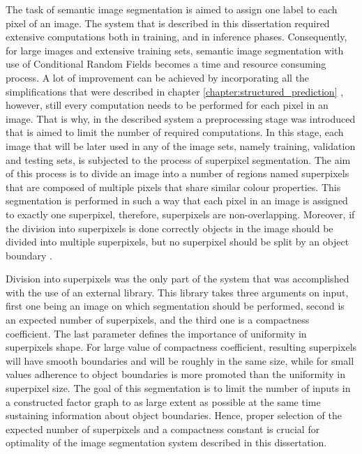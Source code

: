 The task of semantic image segmentation is aimed to assign one label to each pixel of an image. The system that is described in this dissertation required extensive computations both in training, and in inference phases. Consequently, for large images and extensive training sets, semantic image segmentation with use of Conditional Random Fields becomes a time and resource consuming process. A lot of improvement can be achieved by incorporating all the simplifications that were described in chapter \ref{chapter:structured_prediction} , however, still every computation needs to be performed for each pixel in an image. That is why, in the described system a preprocessing stage was introduced that is aimed to limit the number of required computations. In this stage, each image that will be later used in any of the image sets, namely training, validation and testing sets, is subjected to the process of superpixel segmentation. The aim of this process is to divide an image into a number of regions named superpixels that are composed of multiple pixels that share similar colour properties. This segmentation is performed in such a way that each pixel in an image is assigned to exactly one superpixel, therefore, superpixels are non-overlapping. Moreover, if the division into superpixels is done correctly objects in the image should be divided into multiple superpixels, but no superpixel should be split by an object boundary \cite{superpixels}.

Division into superpixels was the only part of the system that was accomplished with the use of an external library. This library takes three arguments on input, first one being an image on which segmentation should be performed, second is an expected number of superpixels, and the third one is a compactness coefficient. The last parameter defines the importance of uniformity in superpixels shape. For large value of compactness coefficient, resulting superpixels will have smooth boundaries and will be roughly in the same size, while for small values adherence to object boundaries is more promoted than the uniformity in superpixel size. The goal of this segmentation is to limit the number of inputs in a constructed factor graph to as large extent as possible at the same time sustaining information about object boundaries. Hence, proper selection of the expected number of superpixels and a compactness constant is crucial for optimality of the image segmentation system described in this dissertation. 

